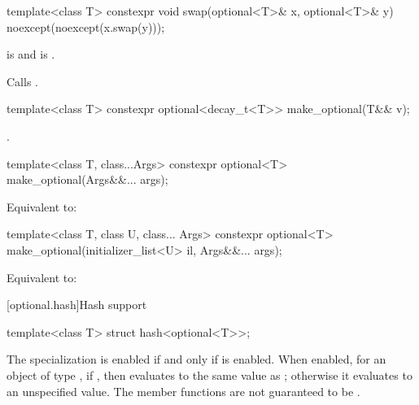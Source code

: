 %
\begin{itemdecl}
template<class T>
  constexpr void swap(optional<T>& x, optional<T>& y) noexcept(noexcept(x.swap(y)));
\end{itemdecl}

\begin{itemdescr}
\pnum
\constraints
{} is  and
 is .

\pnum
\effects
Calls .
\end{itemdescr}

%
\begin{itemdecl}
template<class T> constexpr optional<decay_t<T>> make_optional(T&& v);
\end{itemdecl}

\begin{itemdescr}
\pnum
\returns
{}.
\end{itemdescr}

%
\begin{itemdecl}
template<class T, class...Args>
  constexpr optional<T> make_optional(Args&&... args);
\end{itemdecl}

\begin{itemdescr}
\pnum
\effects
Equivalent to: 
\end{itemdescr}

%
\begin{itemdecl}
template<class T, class U, class... Args>
  constexpr optional<T> make_optional(initializer_list<U> il, Args&&... args);
\end{itemdecl}

\begin{itemdescr}
\pnum
\effects
Equivalent to: 
\end{itemdescr}

[optional.hash]{Hash support}

%
\begin{itemdecl}
template<class T> struct hash<optional<T>>;
\end{itemdecl}

\begin{itemdescr}
\pnum
The specialization  is enabled
if and only if  is enabled.
When enabled, for an object  of type ,
if , then 
evaluates to the same value as ;
otherwise it evaluates to an unspecified value.
The member functions are not guaranteed to be .
\end{itemdescr}


